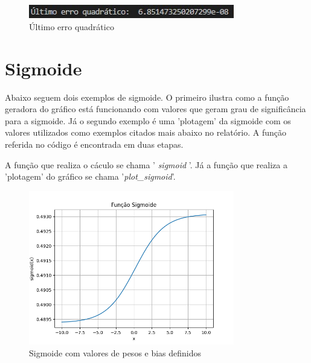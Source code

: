 \documentclass{article}
\begin{document}
\begin{figure}[htbp]
    \centering
    \includegraphics[width=0.8\textwidth]{Ultimo Erro Quadratico.jpg}
    \caption{Último erro quadrático}
    \label{fig:funcao_erro2}
\end{figure}

\newpage

\section{Sigmoide}
\begin{flushleft}
Abaixo seguem dois exemplos de sigmoide. O primeiro ilustra como a função geradora do gráfico está funcionando com valores que geram grau de significância para a sigmoide. Já o segundo exemplo é uma 'plotagem' da sigmoide com os valores utilizados como exemplos citados mais abaixo no relatório. A função referida no código é encontrada em duas etapas. 
\end{flushleft}

\begin{flushleft}
A função que realiza o cáculo se chama '\textit{ sigmoid }'. Já a função que realiza a 'plotagem' do gráfico se chama '\textit{plot\_sigmoid}'.
\end{flushleft}

\begin{figure}[htbp]
    \centering
    \includegraphics[width=0.8\textwidth]{Figure_2.png}
    \caption{Sigmoide com valores de pesos e bias definidos}
    \label{fig:sigmoide1}
\end{figure}
\end{document}
